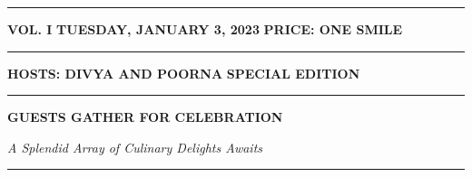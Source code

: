 \documentclass[a4paper,10pt]{article}
\newcommand{\thinrule}{\noindent\rule{\linewidth}{0.4pt}}
\newcommand{\thickrule}{\noindent\rule{\linewidth}{1.2pt}}
\begin{document}
\begin{center}
    {\fontsize{60}{65}}

    \vspace{0.1cm}
    \thickrule
    \vspace{0.05cm}

    \footnotesize \textbf{VOL. I} \hfill \textbf{TUESDAY, JANUARY 3, 2023} \hfill \textbf{PRICE: ONE SMILE}

    \vspace{0.05cm}
    \thinrule
    \vspace{0.05cm}
    \textbf{HOSTS: DIVYA AND POORNA} \hfill \textbf{SPECIAL EDITION}
    \vspace{0.05cm}
    \thickrule
\end{center}

\vspace{0.2cm}

\begin{center}
    {\fontsize{20}{24}\selectfont \textbf{GUESTS GATHER FOR CELEBRATION}}

    \vspace{0.1cm}
    \textit{\normalsize A Splendid Array of Culinary Delights Awaits}
\end{center}

\vspace{0.2cm}
\thinrule
\vspace{0.2cm}
\end{document}
